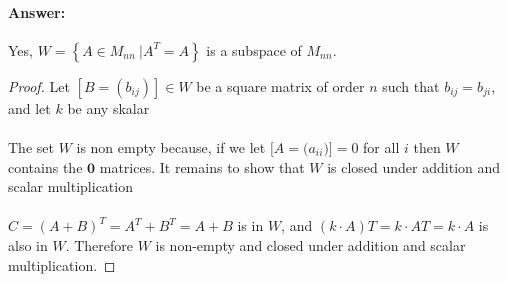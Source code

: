 \documentclass[12pt]{article}
\begin{document}
\begin{enumerate}
\begin{enumerate}
                            \paragraph{Answer:} Yes, $W={ \left\{A \in{M_{nn}} \ |
                                    A^T = A \right\}}$ is a subspace of $M_{nn}$.
                            \begin{proof}
                                    Let $[B = (b_{ij})]\in W$ be a square matrix of order $n$ such that $b_{ij} = b_{ji}$, and let ${k}$ be any skalar\\\\
                                    The set $W$ is non empty because, if we let $[A=({a_{ii})]=0}$ for all $i$ then $W$ contains the $\mathbf{0}$ matrices.
                                    It remains to show that $W$ is closed under addition and scalar multiplication\\\\
                                    $C = (A+B)^T = A^T+B^T = A + B$ is in $W$,
                                    and $(k\cdot A)T = k\cdot AT = k\cdot A$ is also in $W$.
                                    Therefore $W$ is non-empty and closed under addition and scalar multiplication.
                            \end{proof}
              \end{enumerate}
\end{enumerate}
\end{document}
